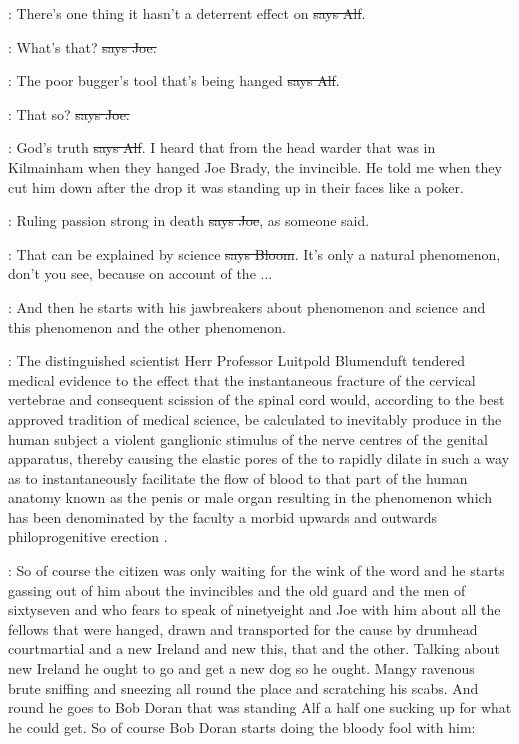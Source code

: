 \bergan:
There's one thing it hasn't a deterrent effect
on \sout{says Alf}.

\joe:
What's that? \sout{says Joe.}

\bergan:
The poor bugger's tool that's being hanged
\sout{says Alf}.

\joe:
That so? \sout{says Joe.}

\bergan:
God's truth \sout{says Alf}.
I heard that from the head warder that was in
Kilmainham when they hanged Joe Brady, the invincible.
He told me when
they cut him down after the drop it was standing up in their faces like a
poker.

\joe:
Ruling passion strong in death \sout{says Joe},
as someone said.

\Bloom:
That can be explained by science \sout{says Bloom}.
It's only a natural
phenomenon, don't you see, because on account of the ...

\Nq:
And then he starts with his jawbreakers about phenomenon and
science and this phenomenon and the other phenomenon.

:
The distinguished scientist Herr Professor Luitpold Blumenduft
tendered medical evidence to the effect that the instantaneous fracture of
the cervical vertebrae
and consequent scission of the spinal cord would,
according to the best approved tradition of medical science, be calculated
to inevitably produce in the human subject a violent ganglionic stimulus
of the nerve centres of the genital apparatus, thereby causing the elastic
pores of the  to rapidly dilate in such a way as to
instantaneously facilitate the flow of blood to that part of the human
anatomy known as the penis or male organ resulting in the phenomenon which
has been denominated by the faculty a morbid upwards and outwards
philoprogenitive erection .

\Nq:
So of course the citizen was only waiting for the wink of the word and
he starts gassing out of him
about the invincibles and the old guard and
the men of sixtyseven and who fears to speak of ninetyeight and Joe with
him about all the fellows that were hanged, drawn and transported for the
cause by drumhead courtmartial and a new Ireland and new this, that and
the other. Talking about new Ireland he ought to go and get a new dog so
he ought. Mangy ravenous brute sniffing and sneezing all round the place
and scratching his scabs. And round he goes to Bob Doran that was
standing Alf a half one sucking up for what he could get. So of course Bob
Doran starts doing the bloody fool with him:

